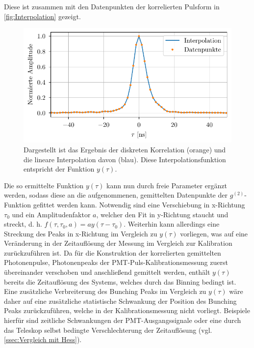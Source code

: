 Diese ist zusammen mit den Datenpunkten der korrelierten Pulsform in \autoref{fig:Interpolation} gezeigt. 
\begin{figure}[h]
    \centering
    \includegraphics{images/Analysis/interpolation.pdf}
    \caption{Dargestellt ist das Ergebnis der diskreten Korrelation (orange) und die lineare Interpolation davon (blau). Diese Interpolationsfunktion entspricht der Funktion $y(\tau)$.}
    \label{fig:Interpolation}
\end{figure}
Die so ermittelte Funktion $y(\tau)$ kann nun durch freie Parameter ergänzt werden, sodass diese an die aufgenommenen, gemittelten Datenpunkte der $g^{(2)}$-Funktion gefittet werden kann. 
Notwendig sind eine Verschiebung in x-Richtung $\tau_0$ und ein Amplitudenfaktor $a$, welcher den Fit in y-Richtung staucht und streckt, d. h. $f(\tau, \tau_0, a) = ay(\tau - \tau_0)$. 
Weiterhin kann allerdings eine Streckung des Peaks in x-Richtung im Vergleich zu $y(\tau)$ vorliegen, was auf eine Veränderung in der Zeitauflösung der Messung im Vergleich zur Kalibration zurückzuführen ist. 
Da für die Konstruktion der korrelierten gemittelten Photonenpulse, Photonenpeaks der PMT-Puls-Kalibrationsmessung zuerst übereinander verschoben und anschließend gemittelt werden, enthält $y(\tau)$ bereits die Zeitauflösung des Systems, welches durch das Binning bedingt ist. 
Eine zusätzliche Verbreiterung des Bunching Peaks im Vergleich zu $y(\tau)$ wäre daher auf eine zusätzliche statistische Schwankung der Position des Bunching Peaks zurückzuführen, welche in der Kalibrationsmessung nicht vorliegt. 
Beispiele hierfür sind zeitliche Schwankungen der PMT-Ausgangssignale oder eine durch das Teleskop selbst bedingte Verschlechterung der Zeitauflösung (vgl. \autoref{ssec:Vergleich mit Hess}).

